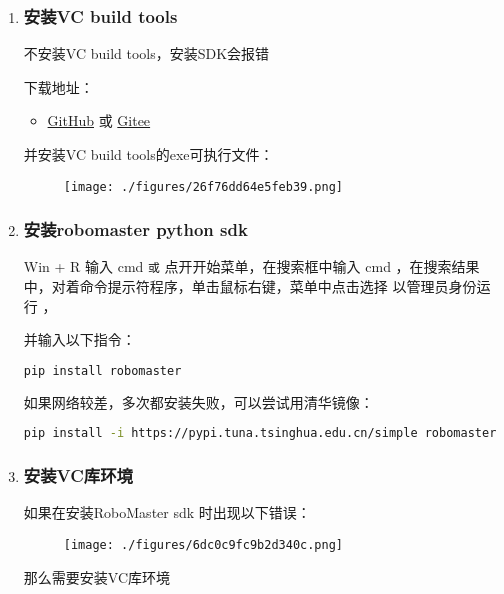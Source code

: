 \begin{enumerate}
\item \subsubsection{安装VC build tools}
不安装VC build tools，安装SDK会报错

下载地址：\begin{itemize}
\item \href{https://github.com/dji-sdk/robomaster-sdk}{GitHub} 或 \href{https://gitee.com/xitinglin/RoboMaster-SDK}{Gitee}
\end{itemize}

并安装VC build tools的exe可执行文件：

\begin{figure}[ht]
\centering
\texttt{[image: ./figures/26f76dd64e5feb39.png]}
\caption{} \label{fig_PyRM1_1}
\end{figure}

\item \subsubsection{安装robomaster python sdk}
Win + R 输入 cmd 
\verb|或|
点开开始菜单，在搜索框中输入 cmd ，在搜索结果中，对着命令提示符程序，单击鼠标右键，菜单中点击选择 以管理员身份运行 ，

并输入以下指令：

\begin{lstlisting}[language=bash]
pip install robomaster
\end{lstlisting}

如果网络较差，多次都安装失败，可以尝试用清华镜像：

\begin{lstlisting}[language=bash]
pip install -i https://pypi.tuna.tsinghua.edu.cn/simple robomaster
\end{lstlisting}

\item \subsubsection{安装VC库环境}
如果在安装RoboMaster sdk 时出现以下错误：
\begin{figure}[ht]
\centering
\texttt{[image: ./figures/6dc0c9fc9b2d340c.png]}
\caption{} \label{fig_PyRM1_2}
\end{figure}
那么需要安装VC库环境


\end{enumerate}
